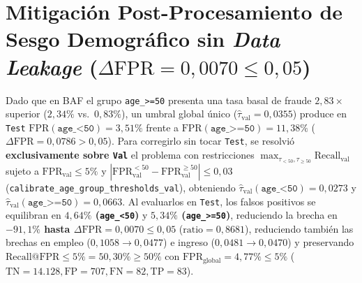 \documentclass[9pt,letterpaper]{article}
\begin{document}
\section{Mitigación Post-Procesamiento de Sesgo Demográfico sin \textit{Data Leakage} ($\Delta\text{FPR} = 0,0070 \le 0,05$)}
Dado que en BAF el grupo \texttt{age\_>=50} presenta una tasa basal de fraude $2,83\times$ superior ($2,34\%$ vs.\ $0,83\%$), un umbral global único ($\hat{\tau}_{\text{val}}=0,0355$) produce en \texttt{Test} $\text{FPR}(\texttt{age\_<50})=3,51\%$ frente a $\text{FPR}(\texttt{age\_>=50})=11,38\%$ ($\Delta\text{FPR}=0,0786 > 0,05$). Para corregirlo sin tocar \texttt{Test}, se resolvió \textbf{exclusivamente sobre \texttt{Val}} el problema con restricciones $\max_{\tau_{<50},\tau_{\ge 50}} \text{Recall}_{\text{val}}$ sujeto a $\text{FPR}_{\text{val}}\le 5\%$ y $|\text{FPR}_{\text{val}}^{<50}-\text{FPR}_{\text{val}}^{\ge 50}|\le 0,03$ (\texttt{calibrate\_age\_group\_thresholds\_val}), obteniendo $\hat{\tau}_{\text{val}}(\texttt{age\_<50})=0,0273$ y $\hat{\tau}_{\text{val}}(\texttt{age\_>=50})=0,0663$. Al evaluarlos en \texttt{Test}, los falsos positivos se equilibran en \textbf{$4,64\%$ (\texttt{age\_<50})} y \textbf{$5,34\%$ (\texttt{age\_>=50})}, reduciendo la brecha en \textbf{$-91,1\%$ hasta $\Delta\text{FPR}=0,0070 \le 0,05$} ($\text{ratio}=0,8681$), reduciendo también las brechas en empleo ($0,1058\to 0,0477$) e ingreso ($0,0481\to 0,0470$) y preservando \textbf{$\text{Recall@FPR}\le 5\% = 50,30\% \ge 50\%$} con $\text{FPR}_{\text{global}}=4,77\% \le 5\%$ ($\text{TN}=14.128, \text{FP}=707, \text{FN}=82, \text{TP}=83$).
\end{document}

